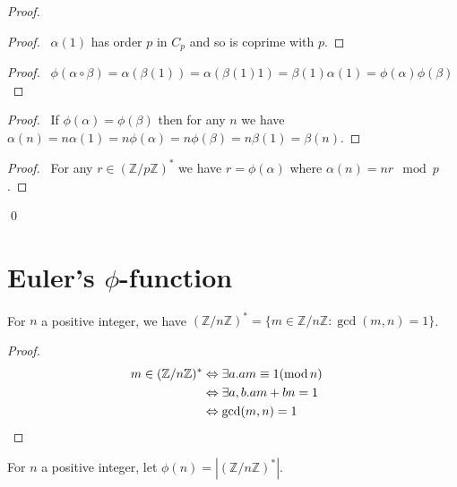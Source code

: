 \begin{proof}
    \pf
    \begin{proof}
        \pf\ $\alpha(1)$ has order $p$ in $C_p$ and so is coprime with $p$.
    \end{proof}
    \begin{proof}
        \pf\ $\phi(\alpha \circ \beta) = \alpha(\beta(1)) = \alpha(\beta(1) 1) = \beta(1) \alpha(1) = \phi(\alpha) \phi(\beta)$
    \end{proof}
    \begin{proof}
        \pf\ If $\phi(\alpha) = \phi(\beta)$ then for any $n$ we have $\alpha(n) = n \alpha(1) = n \phi(\alpha) = n \phi(\beta) = n \beta(1) = \beta(n)$.
    \end{proof}
    \begin{proof}
        \pf\ For any $r \in (\mathbb{Z} / p \mathbb{Z})^*$ we have $r = \phi(\alpha)$ where $\alpha(n) = nr \mod p$.
    \end{proof}
    \qed
\end{proof}

\section{Euler's $\phi$-function}

\begin{prop}
    For $n$ a positive integer, we have $(\mathbb{Z} / n \mathbb{Z})^* = \{ m \in \mathbb{Z} / n \mathbb{Z} : \gcd(m,n) = 1 \}$.
\end{prop}

\begin{proof}
\pf
\begin{align*}
m \in (\mathbb{Z} / n \mathbb{Z})^* & \Leftrightarrow \exists a. am \equiv 1 (\mod n) \\
& \Leftrightarrow \exists a,b. am + bn = 1 \\
& \Leftrightarrow \gcd(m,n) = 1 & \qed
\end{align*}
\end{proof}

\begin{df}
    For $n$ a positive integer, let $\phi(n) = |(\mathbb{Z} / n \mathbb{Z})^*|$.
\end{df}


